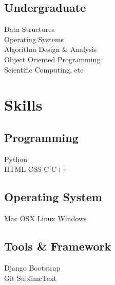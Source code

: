 \documentclass[]{deedy-resume-openfont}
\begin{document}
\begin{minipage}[t]{0.33\textwidth}


\subsection{Undergraduate}
Data Structures \\
Operating Systems \\
Algorithm Design \& Analysis \\
Object Oriented Programming \\
Scientific Computing, etc \\
\sectionsep


\section{Skills}
\subsection{Programming}
Python \\
HTML \textbullet{} CSS \textbullet{} C \textbullet{} C++ \\
\subsection{Operating System}
Mac OSX \textbullet{} Linux \textbullet{} Windows
\subsection{Tools \& Framework}
Django \textbullet{} Bootstrap \\
Git \textbullet SublimeText
\sectionsep


\end{minipage}
\end{document}
